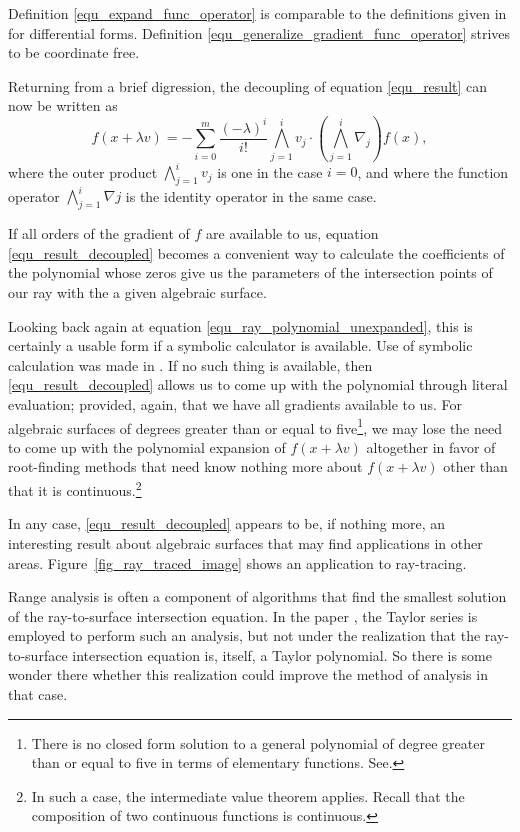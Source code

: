\documentclass{birkjour}
\theoremstyle{definition}
\theoremstyle{remark}
\numberwithin{equation}{section}
\begin{document}
Definition \eqref{equ_expand_func_operator} is comparable to the
definitions given in \cite{Hestenes93,Macdonald12} for differential forms.
Definition \eqref{equ_generalize_gradient_func_operator} strives to be coordinate free.

Returning from a brief digression, the decoupling of equation \eqref{equ_result} can now be written as
\begin{equation}\label{equ_result_decoupled}
f(x+\lambda v) = -\sum_{i=0}^m\frac{(-\lambda)^i}{i!}\bigwedge_{j=1}^i v_j\cdot\left(\bigwedge_{j=1}^i\nabla_j\right)f(x),
\end{equation}
where the outer product $\bigwedge_{j=1}^i v_j$ is one in the case $i=0$, and where the function
operator $\bigwedge_{j=1}^i\nabla j$ is the identity operator in the same case.

If all orders of the gradient of $f$ are available to us, equation \eqref{equ_result_decoupled} becomes
a convenient way to calculate the coefficients of the polynomial whose zeros give us the parameters of
the intersection points of our ray with the a given algebraic surface.

Looking back again at equation \eqref{equ_ray_polynomial_unexpanded}, this is certainly a usable form
if a symbolic calculator is available.  Use of symbolic calculation was made in \cite{Hanrahan83}.  If no such
thing is available, then \eqref{equ_result_decoupled} allows us to come up with the polynomial
through literal evaluation; provided, again, that we have all gradients available to us.
For algebraic surfaces of degrees greater than or equal to five\footnote{There is no closed form solution
to a general polynomial of degree greater than or equal to five in terms of elementary functions.  See\cite{Gallian12}.}, we may
lose the need to come up
with the polynomial expansion of $f(x+\lambda v)$ altogether in favor of root-finding methods
that need know nothing more about $f(x+\lambda v)$ other than that it is continuous.\footnote{In such a
case, the intermediate value theorem applies.  Recall that the composition of two continuous functions
is continuous.}

In any case, \eqref{equ_result_decoupled} appears to be, if nothing more, an
interesting result about algebraic surfaces that may find applications in other areas.
Figure~\ref{fig_ray_traced_image} shows an application to ray-tracing.

Range analysis is often a component of algorithms that find the smallest
solution of the ray-to-surface intersection equation.  In the paper \cite{Shou06},
the Taylor series is employed to perform such an analysis, but not under
the realization that the ray-to-surface intersection equation is, itself, a
Taylor polynomial.  So there is some wonder there whether this realization
could improve the method of analysis in that case.



\end{document}
